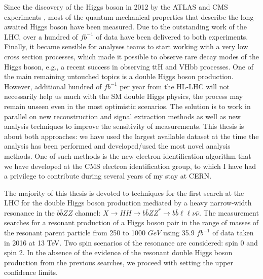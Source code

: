 Since the discovery of the Higgs boson in 2012 by the ATLAS and CMS experiments%
, most of the quantum mechanical properties that describe the long-awaited Higgs boson have been measured. Due to the outstanding work of the LHC, over a hundred of $fb^{-1}$ of data have been delivered to both experiments. Finally, it became sensible for analyses teams to start working with a very low cross section processes, which made it possible to observe rare decay modes of the Higgs boson, e.g., a recent success in observing ttH and VHbb processes. One of the main remaining untouched topics is a double Higgs boson production. However, additional hundred of $fb^{-1}$ per year from the HL-LHC will not necessarily help us much with the SM double Higgs physics, the process may remain unseen even in the most optimistic scenarios. The solution is to work in parallel on new reconstruction and signal extraction methods as well as new analysis techniques to improve the sensitivity of measurements. This thesis is about both approaches: we have used the largest available dataset at the time the analysis has been performed and developed/used the most novel analysis methods. One of such methods is the new electron identification algorithm that we have developed at the CMS electron identification group, to which I have had a privilege to contribute during several years of my stay at CERN.

The majority of this thesis is devoted to techniques for the first search at the LHC for the double Higgs boson production mediated by a heavy narrow-width resonance in the $b\bar{b}ZZ$ channel:  $X \to HH \to b\bar{b}ZZ^{*} \to b\bar{b} \ell\ell\nu \bar{\nu}$. The measurement searches for a resonant production of a Higgs boson pair in the range of masses of the resonant parent particle from 250 to 1000 $GeV$ using 35.9 $fb^{-1}$ of data taken in 2016 at 13 TeV. Two spin scenarios of the resonance are considered: spin 0 and spin 2. In the absence of the evidence of the resonant double Higgs boson production from the previous searches, we proceed with setting the upper confidence limits. %